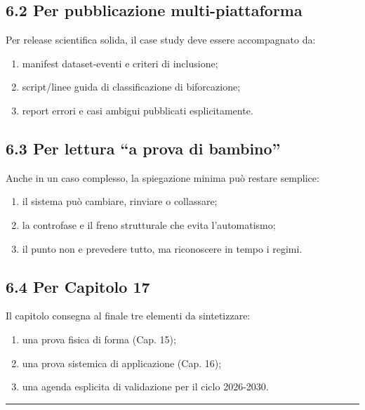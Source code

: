 \subsection{6.2 Per pubblicazione multi-piattaforma}

Per release scientifica solida, il case study deve essere accompagnato da:

\begin{enumerate}
\def\labelenumi{\arabic{enumi}.}
\tightlist
\item
  manifest dataset-eventi e criteri di inclusione;
\item
  script/linee guida di classificazione di biforcazione;
\item
  report errori e casi ambigui pubblicati esplicitamente.
\end{enumerate}

\subsection{6.3 Per lettura ``a prova di bambino''}

Anche in un caso complesso, la spiegazione minima può restare semplice:

\begin{enumerate}
\def\labelenumi{\arabic{enumi}.}
\tightlist
\item
  il sistema può cambiare, rinviare o collassare;
\item
  la controfase e il freno strutturale che evita l'automatismo;
\item
  il punto non e prevedere tutto, ma riconoscere in tempo i regimi.
\end{enumerate}

\subsection{6.4 Per Capitolo 17}

Il capitolo consegna al finale tre elementi da sintetizzare:

\begin{enumerate}
\def\labelenumi{\arabic{enumi}.}
\tightlist
\item
  una prova fisica di forma (Cap. 15);
\item
  una prova sistemica di applicazione (Cap. 16);
\item
  una agenda esplicita di validazione per il ciclo 2026-2030.
\end{enumerate}

\begin{center}\rule{0.5\linewidth}{0.5pt}\end{center}


